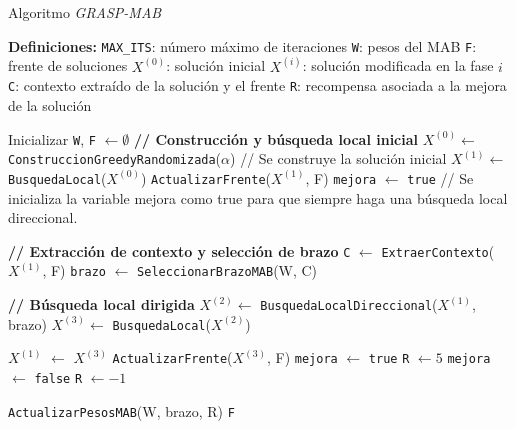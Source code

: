 \documentclass[12pt,a4paper]{book}
\begin{document}
\begin{algorithm}[H]
\caption{Algoritmo \textit{GRASP-MAB}}
\begin{algorithmic}[1]
    \Statex \textbf{Definiciones:}
    \Statex \hspace{1em} \texttt{MAX\_ITS}: número máximo de iteraciones
    \Statex \hspace{1em} \texttt{W}: pesos del MAB
    \Statex \hspace{1em} \texttt{F}: frente de soluciones
    \Statex \hspace{1em} $X^{(0)}$: solución inicial
    \Statex \hspace{1em} $X^{(i)}$: solución modificada en la fase $i$
    \Statex \hspace{1em} \texttt{C}: contexto extraído de la solución y el frente
    \Statex \hspace{1em} \texttt{R}: recompensa asociada a la mejora de la solución

    \Statex

    \State Inicializar \texttt{W}, \texttt{F} $\gets \emptyset$
        \Statex \textbf{// Construcción y búsqueda local inicial}
        \State $X^{(0)}\gets$ \texttt{ConstruccionGreedyRandomizada}($\alpha$) // Se construye la solución inicial
        \State $X^{(1)}\gets$ \texttt{BusquedaLocal}($X^{(0)}$)
        \State \texttt{ActualizarFrente}($X^{(1)}$, F)
        \State \texttt{mejora} $\gets$ \texttt{true} // Se inicializa la variable mejora como true para que siempre haga una búsqueda local direccional.
        
            \Statex \textbf{// Extracción de contexto y selección de brazo}
            \State \texttt{C} $\gets$ \texttt{ExtraerContexto}($X^{(1)}$, F)
            \State \texttt{brazo} $\gets$ \texttt{SeleccionarBrazoMAB}(W, C)
            
            \Statex \textbf{// Búsqueda local dirigida}
            \State $X^{(2)}\gets$ \texttt{BusquedaLocalDireccional}($X^{(1)}$, brazo)
            \State $X^{(3)}\gets$ \texttt{BusquedaLocal}($X^{(2)}$)
            
                \State \texttt{$X^{(1)}$} $\gets$ $X^{(3)}$
                \State \texttt{ActualizarFrente}($X^{(3)}$, F)
                \State \texttt{mejora} $\gets$ \texttt{true}
                \State \texttt{R} $\gets 5$
            \Else
                \State \texttt{mejora} $\gets$ \texttt{false}
                \State \texttt{R} $\gets -1$
            \EndIf

            \State \texttt{ActualizarPesosMAB}(W, brazo, R)
        \EndWhile
    \EndFor
    \State \Return \texttt{F}
\end{algorithmic}
\end{algorithm}
\end{document}
